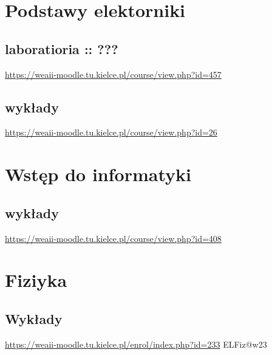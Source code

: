 \documentclass[11pt]{article}
\begin{document}
\section{Podstawy elektorniki}
\label{sec:orgd780fa8}
\subsection{laboratioria :: ???}
\label{sec:org756ac10}
\url{https://weaii-moodle.tu.kielce.pl/course/view.php?id=457}
\subsection{wykłady}
\label{sec:org4ee7c06}
\url{https://weaii-moodle.tu.kielce.pl/course/view.php?id=26}
\section{Wstęp do informatyki}
\label{sec:orgd64bf22}
\subsection{wykłady}
\label{sec:org302b4f1}
\url{https://weaii-moodle.tu.kielce.pl/course/view.php?id=408}
\section{Fiziyka}
\label{sec:orgc911690}
\subsection{Wykłady}
\label{sec:org5b97a04}
\url{https://weaii-moodle.tu.kielce.pl/enrol/index.php?id=233} ELFiz@w23
\end{document}
